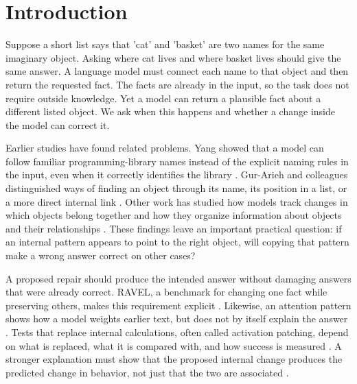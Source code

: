 \documentclass[10pt,letterpaper]{article}
\begin{document}
\clearpage


\fancyheadoffset[L]{0in}\fancyfootoffset[L]{0in}

\linenumbers

\section*{Introduction}

Suppose a short list says that 'cat' and 'basket' are two names for the same imaginary object. Asking where cat lives and where basket lives should give the same answer. A language model must connect each name to that object and then return the requested fact. The facts are already in the input, so the task does not require outside knowledge. Yet a model can return a plausible fact about a different listed object. We ask when this happens and whether a change inside the model can correct it.


Earlier studies have found related problems. Yang showed that a model can follow familiar programming-library names instead of the explicit naming rules in the input, even when it correctly identifies the library \cite{yang2026import}. Gur-Arieh and colleagues distinguished ways of finding an object through its name, its position in a list, or a more direct internal link \cite{gurarieh2026mixing}. Other work has studied how models track changes in which objects belong together and how they organize information about objects and their relationships \cite{ohdemberg2026retrieval,dai2026cell}. These findings leave an important practical question: if an internal pattern appears to point to the right object, will copying that pattern make a wrong answer correct on other cases?


A proposed repair should produce the intended answer without damaging answers that were already correct. RAVEL, a benchmark for changing one fact while preserving others, makes this requirement explicit \cite{huang2024ravel}. Likewise, an attention pattern shows how a model weights earlier text, but does not by itself explain the answer \cite{jainwallace2019attention,wiegreffepinter2019attention}. Tests that replace internal calculations, often called activation patching, depend on what is replaced, what it is compared with, and how success is measured \cite{zhangnanda2024patching}. A stronger explanation must show that the proposed internal change produces the predicted change in behavior, not just that the two are associated \cite{geiger2025causal}.
\end{document}
